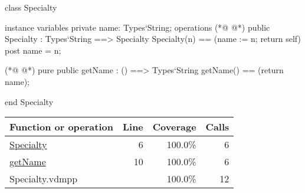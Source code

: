 \begin{vdmpp}[breaklines=true]
class Specialty

instance variables
  private name: Types`String;
operations
(*@
\label{Specialty:6}
@*)
 public Specialty : Types`String ==> Specialty
  Specialty(n) == (name := n; return self)
 post name = n;
  
(*@
\label{getName:10}
@*)
 pure public getName : () ==> Types`String
  getName() == (return name);

end Specialty
\end{vdmpp}
\bigskip
\begin{longtable}{|l|r|r|r|}
\hline
Function or operation & Line & Coverage & Calls \\
\hline
\hline
\hyperref[Specialty:6]{Specialty} & 6&100.0\% & 6 \\
\hline
\hyperref[getName:10]{getName} & 10&100.0\% & 6 \\
\hline
\hline
Specialty.vdmpp & & 100.0\% & 12 \\
\hline
\end{longtable}

